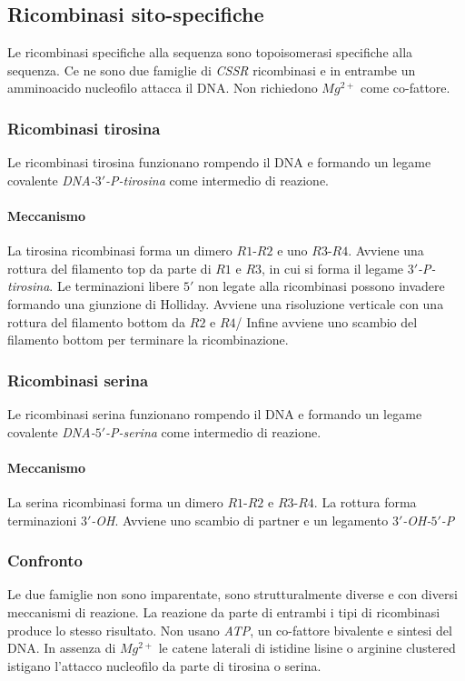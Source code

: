 	\subsection{Ricombinasi sito-specifiche}
	Le ricombinasi specifiche alla sequenza sono topoisomerasi specifiche alla sequenza.
	Ce ne sono due famiglie di \emph{CSSR} ricombinasi e in entrambe un amminoacido nucleofilo attacca il DNA.
	Non richiedono \emph{$Mg^{2+}$} come co-fattore.
	
		\subsubsection{Ricombinasi tirosina}
		Le ricombinasi tirosina funzionano rompendo il DNA e formando un legame covalente \emph{DNA-$3'$-P-tirosina} come intermedio di reazione.

			\paragraph{Meccanismo}
			La tirosina ricombinasi forma un dimero $R1$-$R2$ e uno $R3$-$R4$.
			Avviene una rottura del filamento top da parte di $R1$ e $R3$, in cui si forma il legame \emph{$3'$-P-tirosina}.
			Le terminazioni libere $5'$ non legate alla ricombinasi possono invadere formando una giunzione di Holliday.
			Avviene una risoluzione verticale con una rottura del filamento bottom da $R2$ e $R4$/
			Infine avviene uno scambio del filamento bottom per terminare la ricombinazione.

		\subsubsection{Ricombinasi serina}
		Le ricombinasi serina funzionano rompendo il DNA e formando un legame covalente \emph{DNA-$5'$-P-serina} come intermedio di reazione.

			\paragraph{Meccanismo}
			La serina ricombinasi forma un dimero $R1$-$R2$ e $R3$-$R4$.
			La rottura forma terminazioni \emph{$3'$-OH}.
			Avviene uno scambio di partner e un legamento \emph{$3'$-OH-$5'$-P}

		\subsubsection{Confronto}
		Le due famiglie non sono imparentate, sono strutturalmente diverse e con diversi meccanismi di reazione.
		La reazione da parte di entrambi i tipi di ricombinasi produce lo stesso risultato.
		Non usano \emph{ATP}, un co-fattore bivalente e sintesi del DNA.
		In assenza di \emph{$Mg^{2+}$} le catene laterali di istidine lisine o arginine clustered istigano l'attacco nucleofilo da parte di tirosina o serina.
	
